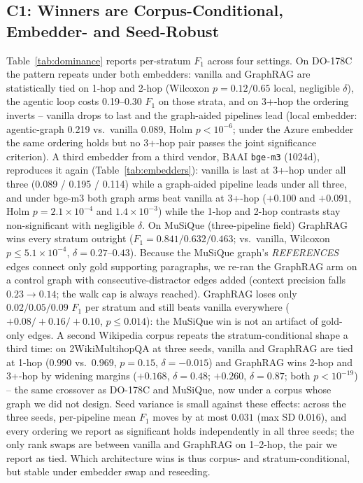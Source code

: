 \subsection{C1: Winners are Corpus-Conditional, Embedder- and Seed-Robust}
\label{sec:c1}
Table~\ref{tab:dominance} reports per-stratum $F_1$ across four settings.
On DO-178C the pattern repeats under both embedders: vanilla and
GraphRAG are statistically tied on 1-hop and 2-hop (Wilcoxon
$p{=}0.12/0.65$ local, negligible $\delta$), the agentic loop costs
0.19--0.30 $F_1$ on those strata, and on 3+-hop the ordering inverts --
vanilla drops to last and the graph-aided pipelines lead (local
embedder: agentic-graph 0.219 vs.\ vanilla 0.089, Holm
$p{<}10^{-6}$; under the Azure embedder the same ordering holds but no
3+-hop pair passes the joint significance criterion). A third embedder
from a third vendor, BAAI \texttt{bge-m3} (1024d), reproduces it again
(Table~\ref{tab:embedders}): vanilla is last at 3+-hop under all three
(0.089 / 0.195 / 0.114) while a graph-aided pipeline leads under all
three, and under bge-m3 both graph arms beat vanilla at 3+-hop
($+0.100$ and $+0.091$, Holm $p{=}2.1{\times}10^{-4}$ and
$1.4{\times}10^{-3}$) while the 1-hop and 2-hop contrasts stay
non-significant with negligible $\delta$. On MuSiQue
(three-pipeline field) GraphRAG wins every stratum outright
($F_1{=}0.841/0.632/0.463$; vs.\ vanilla, Wilcoxon
$p{\leq}5.1{\times}10^{-4}$, $\delta{=}0.27$--$0.43$). Because the
MuSiQue graph's \textit{REFERENCES} edges connect only gold supporting
paragraphs, we re-ran the GraphRAG arm on a control graph with
consecutive-distractor edges added (context precision falls
$0.23{\to}0.14$; the walk cap is always reached). GraphRAG loses only
$0.02/0.05/0.09$ $F_1$ per stratum and still beats vanilla everywhere
($+0.08/+0.16/+0.10$, $p{\leq}0.014$): the MuSiQue win is not an
artifact of gold-only edges. A second Wikipedia corpus repeats the
stratum-conditional shape a third time: on 2WikiMultihopQA at three
seeds, vanilla and GraphRAG are tied at 1-hop ($0.990$ vs.\ $0.969$,
$p{=}0.15$, $\delta{=}{-}0.015$) and GraphRAG wins 2-hop and 3+-hop by
widening margins ($+0.168$, $\delta{=}0.48$; $+0.260$, $\delta{=}0.87$;
both $p{<}10^{-19}$) -- the same crossover as DO-178C and MuSiQue,
now under a corpus whose graph we did not design.
Seed variance is small against these
effects: across the three seeds, per-pipeline mean $F_1$ moves by at
most $0.031$ (max SD $0.016$), and every ordering we report as
significant holds independently in all three seeds; the only rank
swaps are between vanilla and GraphRAG on 1--2-hop, the pair we report
as tied. Which architecture wins is thus corpus- and
stratum-conditional, but stable under embedder swap and reseeding.

